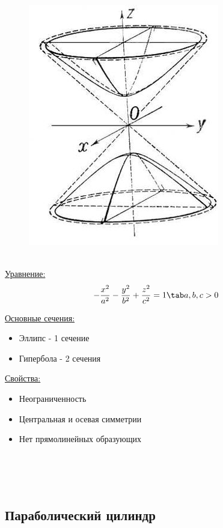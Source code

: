 \begin{figure}
    \includegraphics[width=.7\linewidth]{images/двуполостный гиперболоид.jpg}
\end{figure}

\tab\\ 

\underline{Уравнение:}
\[
-\dfrac{x^2}{a^2} - \dfrac{y^2}{b^2} + \dfrac{z^2}{c^2} = 1 \tab a, b, c > 0
\]

\underline{Основные сечения:}
\begin{itemize}
    \item Эллипс - 1 сечение
    \item Гипербола - 2 сечения
\end{itemize}

\underline{Свойства:}
\begin{itemize}
    \item Неограниченность
    \item Центральная и осевая симметрии
    \item Нет прямолинейных образующих
\end{itemize}

\tab\\ \tab\\ \tab\\
\subsection{Параболический цилиндр}

